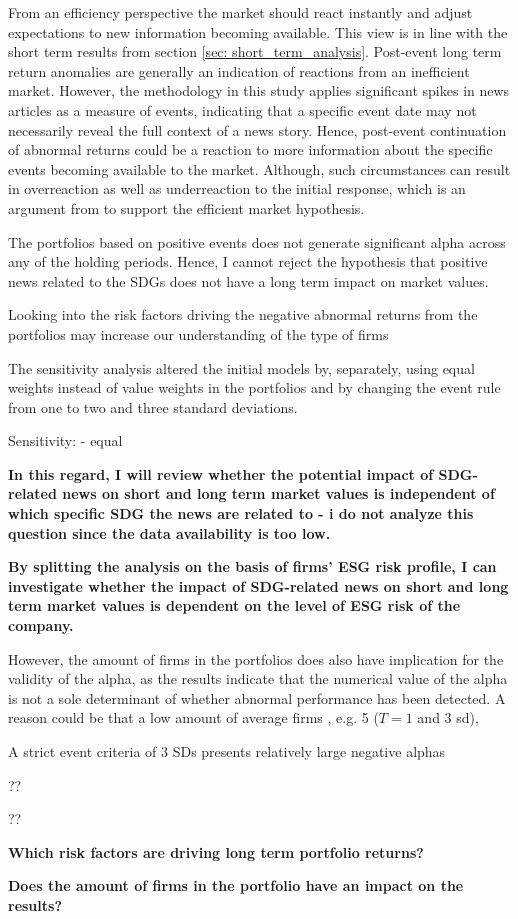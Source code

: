 From an efficiency perspective the market should react instantly and adjust expectations to new information becoming available. This view is in line with the short term results from section \ref{sec: short_term_analysis}. Post-event long term return anomalies are generally an indication of reactions from an inefficient market. However, the methodology in this study applies significant spikes in news articles as a measure of events, indicating that a specific event date may not necessarily reveal the full context of a news story. Hence, post-event continuation of abnormal returns could be a reaction to more information about the specific events becoming available to the market. Although, such circumstances can result in overreaction as well as underreaction to the initial response, which is an argument from \cite{fama1998_events} to support the efficient market hypothesis.   

The portfolios based on positive events does not generate significant alpha across any of the holding periods. Hence, I cannot reject the hypothesis that positive news related to the SDGs does not have a long term impact on market values. 

Looking into the risk factors driving the negative abnormal returns from the portfolios may increase our understanding of the type of firms 

The sensitivity analysis altered the initial models by, separately, using equal weights instead of value weights in the portfolios and by changing the event rule from one to two and three standard deviations. 



Sensitivity:
- equal

\textbf{In this regard, I will review
whether the potential impact of SDG-related news on short and long term market values
is independent of which specific SDG the news are related to - i do not analyze this question since the data availability is too low.}



\textbf{By splitting the analysis on the basis of firms’
ESG risk profile, I can investigate whether the impact of SDG-related news on short and
long term market values is dependent on the level of ESG risk of the company.}

  However, the amount of firms in the portfolios does also have implication for the validity of the alpha, as the results indicate that the numerical value of the alpha is not a sole determinant of whether abnormal performance has been detected. A reason could be that a low amount of average firms , e.g. 5 ($T = 1$ and 3 sd), 

A strict event criteria of 3 SDs presents relatively large negative alphas

  ??

??






\textbf{Which risk factors are driving long term portfolio returns?}


\textbf{Does the amount of firms in the portfolio have an impact on the results?}
